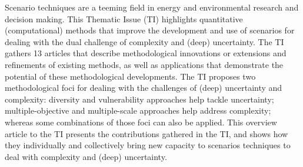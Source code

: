 Scenario techniques are a teeming field in energy and environmental research and decision making. This Thematic Issue (TI) highlights quantitative (computational) methods that improve the development and use of scenarios for dealing with the dual challenge of complexity and (deep) uncertainty. The TI gathers 13 articles that describe methodological innovations or extensions and refinements of existing methods, as well as applications that demonstrate the potential of these methodological developments. The TI proposes two methodological foci for dealing with the challenges of (deep) uncertainty and complexity: diversity and vulnerability approaches help tackle uncertainty; multiple-objective and multiple-scale approaches help address complexity; whereas some combinations of those foci can also be applied. This overview article to the TI presents the contributions gathered in the TI, and shows how they individually and collectively bring new capacity to scenarios techniques to deal with complexity and (deep) uncertainty.